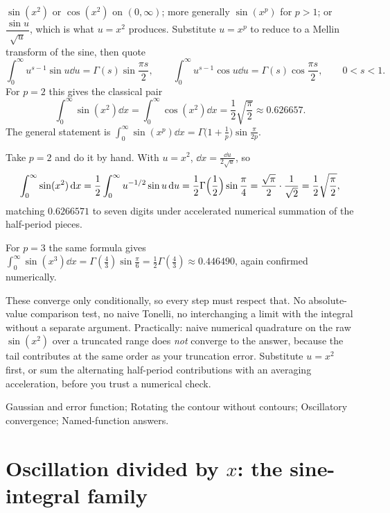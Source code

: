 \cue $\sin(x^{2})$ or $\cos(x^{2})$ on $(0,\infty)$; more generally $\sin(x^{p})$ for $p>1$; or $\dfrac{\sin u}{\sqrt u}$, which is what $u=x^{2}$ produces.
\method Substitute $u=x^{p}$ to reduce to a Mellin transform of the sine, then quote
\[\int_0^{\infty}u^{s-1}\sin u\dd u=\Gamma(s)\sin\frac{\pi s}{2},\qquad
\int_0^{\infty}u^{s-1}\cos u\dd u=\Gamma(s)\cos\frac{\pi s}{2},\qquad 0<s<1.\]
For $p=2$ this gives the classical pair
\[\int_0^{\infty}\sin(x^{2})\dd x=\int_0^{\infty}\cos(x^{2})\dd x=\frac12\sqrt{\frac{\pi}{2}}\approx0.626657.\]
The general statement is $\int_0^{\infty}\sin(x^{p})\dd x=\Gamma\bigl(1+\tfrac1p\bigr)\sin\tfrac{\pi}{2p}$.

\begin{worked}
Take $p=2$ and do it by hand. With $u=x^{2}$, $\dd x=\tfrac{\dd u}{2\sqrt u}$, so
\[\int_0^{\infty}\sin(x^{2})\,\mathrm{d} x=\frac12\int_0^{\infty}u^{-1/2}\sin u\,\mathrm{d} u=\frac12\Gamma\Bigl(\frac12\Bigr)\sin\frac{\pi}{4}=\frac{\sqrt\pi}{2}\cdot\frac{1}{\sqrt2}=\frac12\sqrt{\frac{\pi}{2}},\]
matching $0.6266571$ to seven digits under accelerated numerical summation of the half-period pieces.

For $p=3$ the same formula gives $\int_0^{\infty}\sin(x^{3})\dd x=\Gamma(\tfrac43)\sin\tfrac{\pi}{6}=\tfrac12\Gamma(\tfrac43)\approx0.446490$, again confirmed numerically.
\end{worked}

\begin{trap}
These converge only conditionally, so every step must respect that. No absolute-value comparison test, no naive Tonelli, no interchanging a limit with the integral without a separate argument. Practically: naive numerical quadrature on the raw $\sin(x^{2})$ over a truncated range does \emph{not} converge to the answer, because the tail contributes at the same order as your truncation error. Substitute $u=x^{2}$ first, or sum the alternating half-period contributions with an averaging acceleration, before you trust a numerical check.
\end{trap}

\begin{seealsob}Gaussian and error function; Rotating the contour without contours; Oscillatory convergence; Named-function answers.\end{seealsob}

\section{Oscillation divided by $x$: the sine-integral family}

